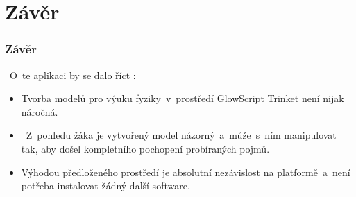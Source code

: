 \documentclass[hyperref={unicode}]{beamer}
\begin{document}
\section{Závěr}
\begin{frame}
\frametitle{Závěr}
~O~te aplikaci by se dalo říct : 
\begin{itemize}
    \item Tvorba modelů pro výuku fyziky~v~prostředí GlowScript Trinket není nijak náročná.
    \item ~Z~pohledu žáka je vytvořený model názorný~a~může~s~ním manipulovat tak, aby došel kompletního pochopení probíraných pojmů. 
    \item Výhodou předloženého prostředí je absolutní nezávislost na platformě~a~není potřeba instalovat žádný další software.
\end{itemize}
\end{frame}
\end{document}
